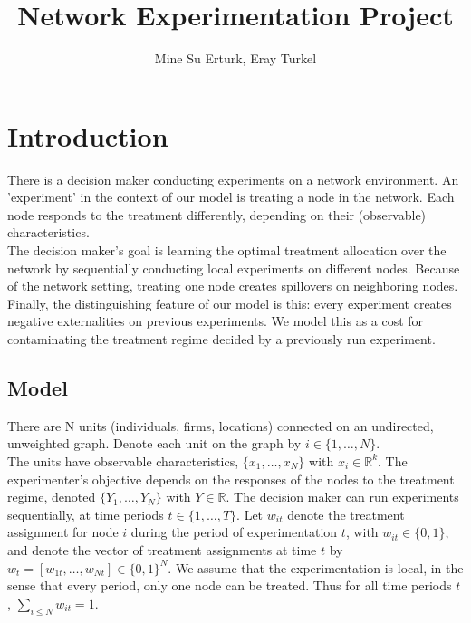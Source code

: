 \documentclass[12pt,a4paper]{article}
\author{Mine Su Erturk, Eray Turkel}
\title{Network Experimentation Project}
\begin{document}
\maketitle

\section{Introduction}

There is a decision maker conducting experiments on a network environment. An 'experiment' in the context of our model is treating a node in the network. Each node responds to the treatment differently, depending on their (observable) characteristics.\\

The decision maker's goal is learning the optimal treatment allocation over the network by sequentially conducting local experiments on different nodes. Because of the network setting, treating one node creates spillovers on neighboring nodes.\\

Finally, the distinguishing feature of our model is this: every experiment creates negative externalities on previous experiments. We model this as a cost for contaminating the treatment regime decided by a previously run experiment.\\

\subsection{Model}

There are N units (individuals, firms, locations) connected on an undirected, unweighted graph. Denote each unit on the graph by $i \in \{1, \dots, N \}$. \\

The units have observable characteristics, $\{x_1 , \dots, x_N \}$ with $x_i \in \mathbb{R}^k$. The experimenter's objective depends on the responses of the nodes to the treatment regime, denoted $\{Y_1 , \dots, Y_N\}$ with $Y \in \mathbb{R}$. The decision maker can run experiments sequentially, at time periods $t \in \{1, \dots , T\}$. Let $w_{it}$ denote the treatment assignment for node $i$ during the period of experimentation $t$, with $w_{it} \in \{0,1\}$, and denote the vector of treatment assignments at time $t$ by $w_t = [w_{1t}, \dots , w_{Nt}] \in \{0,1\}^N$. We assume that the experimentation is local, in the sense that every period, only one node can be treated. Thus for all time periods $t$, $\sum_{i \leq N} w_{it} = 1$.\\
\end{document}
